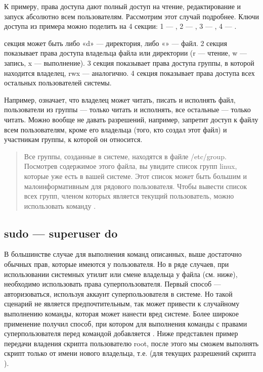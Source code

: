\documentclass[letterpaper,10pt,russian]{sphinxmanual}
\begin{document}
\sphinxAtStartPar
К примеру, права доступа \sphinxcode{\sphinxupquote{{[}drwxrwxrwx{]}}} дают полный доступ на чтение, редактирование и запуск абсолютно всем пользователям. Рассмотрим этот случай подробнее. Ключи доступа из примера можно поделить на 4 секции: 1 — \sphinxcode{\sphinxupquote{{[}d{]}}}, 2 — \sphinxcode{\sphinxupquote{{[}rwx{]}}}, 3 — \sphinxcode{\sphinxupquote{{[}rwx{]}}}, 4 — \sphinxcode{\sphinxupquote{{[}rwx{]}}}.

 секция может быть либо «d» — директория, либо «\sphinxhyphen{}» — файл.
2 секция показывает права доступа владельца файла или директории (r — чтение, w — запись, x — выполнение).
3 секция показывает права доступа группы, в которой находится владелец, rwx — аналогично.
4 секция показывает права доступа всех остальных пользователей системы.

\sphinxAtStartPar
Например,  означает, что владелец может читать, писать и исполнять файл, пользователи из группы — только читать и исполнять, все остальные — только читать. Можно вообще не давать разрешений, например,  запретит доступ к файлу всем пользователям, кроме его владельца (того, кто создал этот файл) и участникам группы, к которой он относится.
\begin{quote}

\sphinxAtStartPar
Все группы, созданные в системе, находятся в файле /etc/group. Посмотрев содержимое этого файла, вы увидите список групп linux, которые уже есть в вашей системе. Этот список может быть большим и малоинформативным для рядового пользователя. Чтобы вывести список всех групп, членом которых является текущий пользователь, можно использовать команду .
\end{quote}


\subsection{sudo — superuser do}
\label{\detokenize{educational_materials/bash/content:sudo-superuser-do}}
\sphinxAtStartPar
В большинстве случае для выполнения команд описанных, выше достаточно обычных прав, которые имеются у пользователя. Но в ряде случаев, при использовании системных утилит или смене владельца у файла (см.  ниже), необходимо использовать права суперпользователя. Первый способ — авторизоваться, используя аккаунт суперпользователя в системе. Но такой сценарий не является предпочтительным, так может привести к случайному выполнению команды, которая может нанести вред системе. Более широкое применение получил способ, при котором для выполнения команды с правами суперпользователя перед командой добавляется . Ниже представлен пример передачи владения скрипта пользователю root, после этого мы сможем выполнять скрипт только от имени нового владельца, т.е.  (для текущих разрешений скрипта ).
\end{document}
